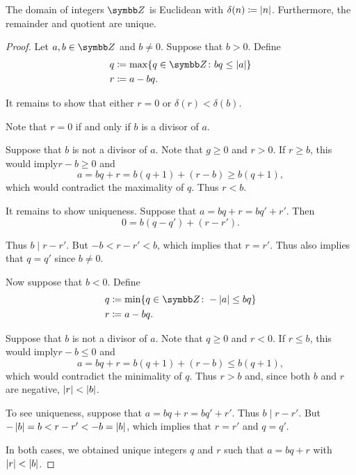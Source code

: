 \begin{proposition}\label{thm:integers_are_euclidean_domain}
  The domain of integers \( \BZ \) is Euclidean with \( \delta(n) \coloneqq \left\vert n \right\vert \). Furthermore, the remainder and quotient are unique.
\end{proposition}
\begin{proof}
  Let \( a, b \in \BZ \) and \( b \neq 0 \). Suppose that \( b > 0 \). Define
  \begin{align*}
    q &\coloneqq \max \{ q \in \BZ \colon bq \leq \Abs{a} \} \\
    r &\coloneqq a - bq.
  \end{align*}

  It remains to show that either \( r = 0 \) or \( \delta(r) < \delta(b) \).

  Note that \( r = 0 \) if and only if \( b \) is a divisor of \( a \).

  Suppose that \( b \) is not a divisor of \( a \). Note that \( g \geq 0 \) and \( r > 0 \). If \( r \geq b \), this would imply\LEM \( r - b \geq 0 \) and
  \begin{equation*}
    a = bq + r = b(q + 1) + (r - b) \geq b(q + 1),
  \end{equation*}
  which would contradict the maximality of \( q \). Thus \( r < b \).

  It remains to show uniqueness. Suppose that \( a = bq + r = bq' + r' \). Then
  \begin{equation*}
    0 = b(q - q') + (r - r').
  \end{equation*}

  Thus \( b \mid r - r' \). But \( -b < r - r' < b \), which implies that \( r = r' \). Thus also implies that \( q = q' \) since \( b \neq 0 \).

  Now suppose that \( b < 0 \). Define
  \begin{align*}
    q &\coloneqq \min \{ q \in \BZ \colon -\Abs{a} \leq bq \} \\
    r &\coloneqq a - bq.
  \end{align*}

  Suppose that \( b \) is not a divisor of \( a \). Note that \( q \geq 0 \) and \( r < 0 \). If \( r \leq b \), this would imply\LEM \( r - b \leq 0 \) and
  \begin{equation*}
    a = bq + r = b(q + 1) + (r - b) \leq b(q + 1),
  \end{equation*}
  which would contradict the minimality of \( q \). Thus \( r > b \) and, since both \( b \) and \( r \) are negative, \( \left\vert r \right\vert < \left\vert b \right\vert \).

  To see uniqueness, suppose that \( a = bq + r = bq' + r' \). Thus \( b \mid r - r' \). But \( -\left\vert b \right\vert = b < r - r' < -b = \left\vert b \right\vert \), which implies that \( r = r' \) and \( q = q' \).

  In both cases, we obtained unique integers \( q \) and \( r \) such that \( a = bq + r \) with \( \left\vert r \right\vert < \left\vert b \right\vert \).
\end{proof}

